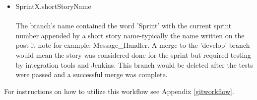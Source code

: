 \begin{itemize}
\item SprintX.shortStoryName\\ \\
The branch's name contained the word 'Sprint' with the current sprint number appended by a short story name-typically the name written on the post-it note for example: Message\_Handler. A merge to the 'develop' branch would mean the story was considered done for the sprint but required testing by integration tools and Jenkins. This branch would be deleted after the tests were passed and a successful merge was complete.
\end{itemize}

For instructions on how to utilize this workflow see Appendix \ref{gitworkflow}.
